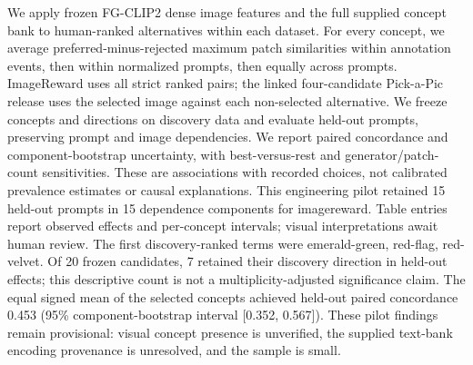 We apply frozen FG-CLIP2 dense image features and the full supplied concept bank to human-ranked alternatives within each dataset. For every concept, we average preferred-minus-rejected maximum patch similarities within annotation events, then within normalized prompts, then equally across prompts. ImageReward uses all strict ranked pairs; the linked four-candidate Pick-a-Pic release uses the selected image against each non-selected alternative. We freeze concepts and directions on discovery data and evaluate held-out prompts, preserving prompt and image dependencies. We report paired concordance and component-bootstrap uncertainty, with best-versus-rest and generator/patch-count sensitivities. These are associations with recorded choices, not calibrated prevalence estimates or causal explanations. This engineering pilot retained 15 held-out prompts in 15 dependence components for imagereward. Table entries report observed effects and per-concept intervals; visual interpretations await human review.
The first discovery-ranked terms were emerald-green, red-flag, red-velvet. Of 20 frozen candidates, 7 retained their discovery direction in held-out effects; this descriptive count is not a multiplicity-adjusted significance claim. The equal signed mean of the selected concepts achieved held-out paired concordance 0.453 (95\% component-bootstrap interval [0.352, 0.567]). These pilot findings remain provisional: visual concept presence is unverified, the supplied text-bank encoding provenance is unresolved, and the sample is small.
